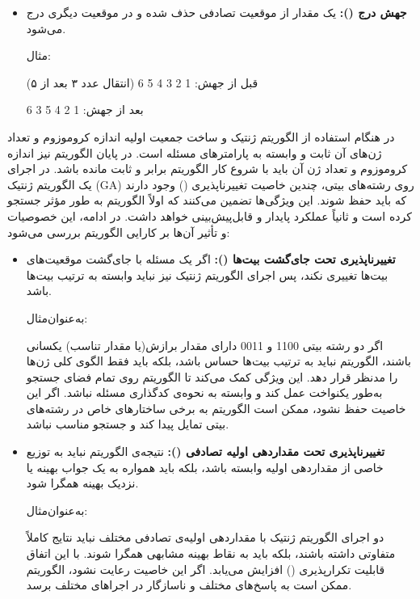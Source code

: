 \documentclass[12pt]{exam}
\begin{document}
\begin{questions}
\begin{parts}
\begin{enumerate}
\begin{itemize}
			\item \textbf{جهش درج ():}
			یک مقدار از موقعیت تصادفی حذف شده و در موقعیت دیگری درج می‌شود.
			
			مثال:
			
			قبل از جهش: 1 2 3 4 5 6  (انتقال عدد ۳ بعد از ۵)
			
			بعد از جهش: 1 2 4 5 3 6
			
		\end{itemize}
	\end{enumerate}
	\end{parts}
	
	\question
	در هنگام استفاده از الگوریتم ژنتیک و ساخت جمعیت اولیه اندازه کروموزوم و تعداد ژن‌های آن ثابت و وابسته به پارامترهای مسئله است. در پایان الگوریتم نیز اندازه کروموزوم و تعداد ژن آن باید با شروع کار الگوریتم برابر و ثابت مانده باشد. در اجرای یک الگوریتم ژنتیک (GA) روی رشته‌های بیتی، چندین خاصیت تغییرناپذیری
	 () وجود دارند که باید حفظ شوند. این ویژگی‌ها تضمین می‌کنند که اولاً الگوریتم به طور مؤثر جستجو کرده است و ثانیاً عملکرد پایدار و قابل‌پیش‌بینی خواهد داشت. در ادامه، این خصوصیات و تأثیر آن‌ها بر کارایی الگوریتم بررسی می‌شود:
	 
	 \begin{itemize}
	 	\item \textbf{تغییرناپذیری تحت جای‌گشت بیت‌ها ():}
	 	اگر یک مسئله با جای‌گشت موقعیت‌های بیت‌ها تغییری نکند، پس اجرای الگوریتم ژنتیک نیز نباید وابسته به ترتیب بیت‌ها باشد.
	 	
	 	به‌عنوان‌مثال:
	 	
	 	اگر دو رشته بیتی 1100 و 0011  دارای مقدار برازش(یا مقدار تناسب) یکسانی باشند، الگوریتم نباید به ترتیب بیت‌ها حساس باشد، بلکه باید فقط الگوی کلی ژن‌ها را مدنظر قرار دهد. این ویژگی کمک می‌کند تا الگوریتم روی تمام فضای جستجو به‌طور یکنواخت عمل کند و وابسته به نحوه‌ی کدگذاری مسئله نباشد. اگر این خاصیت حفظ نشود، ممکن است الگوریتم به برخی ساختارهای خاص در رشته‌های بیتی تمایل پیدا کند و جستجو مناسب نباشد.
	 	\item \textbf{تغییرناپذیری تحت مقداردهی اولیه تصادفی ():}
	 	نتیجه‌ی الگوریتم نباید به توزیع خاصی از مقداردهی اولیه وابسته باشد، بلکه باید همواره به یک جواب بهینه یا نزدیک بهینه همگرا شود.
	 	
	 	به‌عنوان‌مثال:
	 	
	 	دو اجرای الگوریتم ژنتیک با مقداردهی اولیه‌ی تصادفی مختلف نباید نتایج کاملاً متفاوتی داشته باشند، بلکه باید به نقاط بهینه مشابهی همگرا شوند. با این اتفاق قابلیت تکرارپذیری 
	 	() افزایش می‌یابد. اگر این خاصیت رعایت نشود، الگوریتم ممکن است به پاسخ‌های مختلف و ناسازگار در اجراهای مختلف برسد.
	 	

\end{itemize}
\end{questions}
\end{document}
